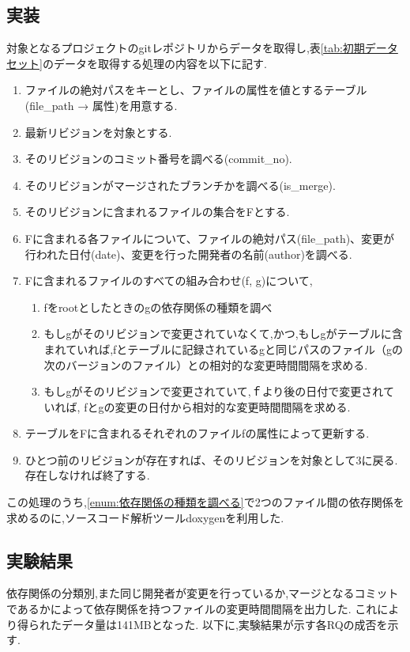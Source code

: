 \documentclass{fose2016}           %
\begin{document}
\subsection{実装}
対象となるプロジェクトのgitレポジトリからデータを取得し,表\ref{tab:初期データセット}のデータを取得する処理の内容を以下に記す.
\begin{enumerate}
\item ファイルの絶対パスをキーとし、ファイルの属性を値とするテーブル(file\_path → 属性)を用意する.
\item 最新リビジョンを対象とする.
\item そのリビジョンのコミット番号を調べる(commit\_no).
\item そのリビジョンがマージされたブランチかを調べる(is\_merge).
\item そのリビジョンに含まれるファイルの集合をFとする.
\item Fに含まれる各ファイルについて、ファイルの絶対パス(file\_path)、変更が行われた日付(date)、変更を行った開発者の名前(author)を調べる.
\item Fに含まれるファイルのすべての組み合わせ(f, g)について,
\begin{enumerate}
\item fをrootとしたときのgの依存関係の種類を調べ\label{enum:依存関係の種類を調べる}
\item もしgがそのリビジョンで変更されていなくて,かつ,もしgがテーブルに含まれていれば,fとテーブルに記録されているgと同じパスのファイル（gの次のバージョンのファイル）との相対的な変更時間間隔を求める.
\item  もしgがそのリビジョンで変更されていて,ｆより後の日付で変更されていれば, fとgの変更の日付から相対的な変更時間間隔を求める.
\end{enumerate}
\item テーブルをFに含まれるそれぞれのファイルfの属性によって更新する.
\item ひとつ前のリビジョンが存在すれば、そのリビジョンを対象として3に戻る.存在しなければ終了する.
\end{enumerate}

この処理のうち,\ref{enum:依存関係の種類を調べる}で2つのファイル間の依存関係を求めるのに,ソースコード解析ツールdoxygenを利用した.

\subsection{実験結果}
依存関係の分類別,また同じ開発者が変更を行っているか,マージとなるコミットであるかによって依存関係を持つファイルの変更時間間隔を出力した.
これにより得られたデータ量は141MBとなった.
以下に,実験結果が示す各RQの成否を示す.
\end{document}
